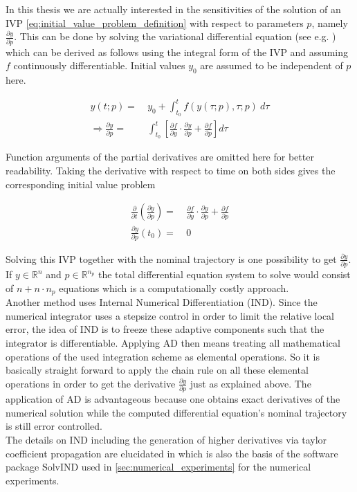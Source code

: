 \documentclass{scrartcl}[12pt, halfparskip]
\numberwithin{equation}{section}
\numberwithin{figure}{section}
\numberwithin{table}{section}
\begin{document}
In this thesis we are actually interested in the sensitivities of the solution of an IVP \cref{eq:initial_value_problem_definition} with respect to parameters $p$, namely $\frac{\partial y}{\partial p}$. 
This can be done by solving the variational differential equation (see e.g. \cite{diff_equations_numerics}) which can be derived as follows using the integral form of the IVP and assuming $f$ continuously differentiable. Initial values $y_0$ are assumed to be independent of $p$ here.

\begin{align}
	y(t;p) = \ & y_0 + \int_{t_0}^{t} f(y(\tau;p),\tau;p) \ d\tau \\
	\Rightarrow \frac{\partial y}{\partial p} = & \int_{t_0}^{t} \left[ \frac{\partial f}{\partial y} \cdot \frac{\partial y}{\partial p} + \frac{\partial f}{\partial p} \right] d\tau \nonumber
\end{align}

Function arguments of the partial derivatives are omitted here for better readability. Taking the derivative with respect to time on both sides gives the corresponding initial value problem

\begin{align}
	\frac{\partial}{\partial t} \left( \frac{\partial y}{\partial p} \right) = \ & \frac{\partial f}{\partial y} \cdot \frac{\partial y}{\partial p} + \frac{\partial f}{\partial p} \\
	\frac{\partial y}{\partial p}(t_0) = \ & 0 \nonumber
\end{align}

Solving this IVP together with the nominal trajectory is one possibility to get $\frac{\partial y}{\partial p}$. If $y \in \mathbb{R}^n$ and $p \in \mathbb{R}^{n_p}$ the total differential equation system to solve would consist of $n + n \cdot n_p$ equations which is a computationally costly approach. \\
Another method uses Internal Numerical Differentiation (IND). Since the numerical integrator uses a stepsize control in order to limit the relative local error, the idea of IND is to freeze these adaptive components such that the integrator is differentiable. 
Applying AD then means treating all mathematical operations of the used integration scheme as elemental operations. So it is basically straight forward to apply the chain rule on all these elemental operations in order to get the derivative $\frac{\partial y}{\partial p}$ just as explained above. 
The application of AD is advantageous because one obtains exact derivatives of the numerical solution while the computed differential equation's nominal trajectory is still error controlled. \\
The details on IND including the generation of higher derivatives via taylor coefficient propagation are elucidated in \cite{diss_jan} which is also the basis of the software package SolvIND used in \cref{sec:numerical_experiments} for the numerical experiments.
\end{document}
